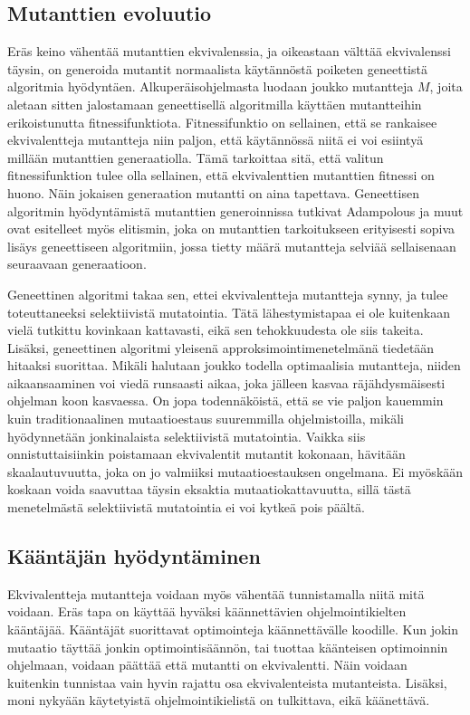 \documentclass{tktltiki}
\begin{document}
\subsection{Mutanttien evoluutio}
Eräs keino vähentää mutanttien ekvivalenssia, ja oikeastaan välttää ekvivalenssi täysin, on generoida mutantit normaalista käytännöstä poiketen geneettistä algoritmia hyödyntäen. Alkuperäisohjelmasta luodaan joukko mutantteja $M$, joita aletaan sitten jalostamaan geneettisellä algoritmilla käyttäen mutantteihin erikoistunutta fitnessifunktiota. Fitnessifunktio on sellainen, että se rankaisee ekvivalentteja mutantteja niin paljon, että käytännössä niitä ei voi esiintyä millään mutanttien generaatiolla. Tämä tarkoittaa sitä, että valitun fitnessifunktion tulee olla sellainen, että ekvivalenttien mutanttien fitnessi on huono. Näin jokaisen generaation mutantti on aina tapettava. Geneettisen algoritmin hyödyntämistä mutanttien generoinnissa tutkivat Adampolous ja muut ovat esitelleet myös elitismin, joka on mutanttien tarkoitukseen erityisesti sopiva lisäys geneettiseen algoritmiin, jossa tietty määrä mutantteja selviää sellaisenaan seuraavaan generaatioon.

Geneettinen algoritmi takaa sen, ettei ekvivalentteja mutantteja synny, ja tulee toteuttaneeksi selektiivistä mutatointia. Tätä lähestymistapaa ei ole kuitenkaan vielä tutkittu kovinkaan kattavasti, eikä sen tehokkuudesta ole siis takeita. Lisäksi, geneettinen algoritmi yleisenä approksimointimenetelmänä tiedetään hitaaksi suorittaa. Mikäli halutaan joukko todella optimaalisia mutantteja, niiden aikaansaaminen voi viedä runsaasti aikaa, joka jälleen kasvaa räjähdysmäisesti ohjelman koon kasvaessa. On jopa todennäköistä, että se vie paljon kauemmin kuin traditionaalinen mutaatioestaus suuremmilla ohjelmistoilla, mikäli hyödynnetään jonkinalaista selektiivistä mutatointia. Vaikka siis onnistuttaisiinkin poistamaan ekvivalentit mutantit kokonaan, hävitään skaalautuvuutta, joka on jo valmiiksi mutaatioestauksen ongelmana. Ei myöskään koskaan voida saavuttaa täysin eksaktia mutaatiokattavuutta, sillä tästä menetelmästä selektiivistä mutatointia ei voi kytkeä pois päältä.

\subsection{Kääntäjän hyödyntäminen}
Ekvivalentteja mutantteja voidaan myös vähentää tunnistamalla niitä mitä voidaan. Eräs tapa on käyttää hyväksi käännettävien ohjelmointikielten kääntäjää. Kääntäjät suorittavat optimointeja käännettävälle koodille. Kun jokin mutaatio täyttää jonkin optimointisäännön, tai tuottaa käänteisen optimoinnin ohjelmaan, voidaan päättää että mutantti on ekvivalentti. Näin voidaan kuitenkin tunnistaa vain hyvin rajattu osa ekvivalenteista mutanteista. Lisäksi, moni nykyään käytetyistä ohjelmointikielistä on tulkittava, eikä käänettävä. 
\end{document}
